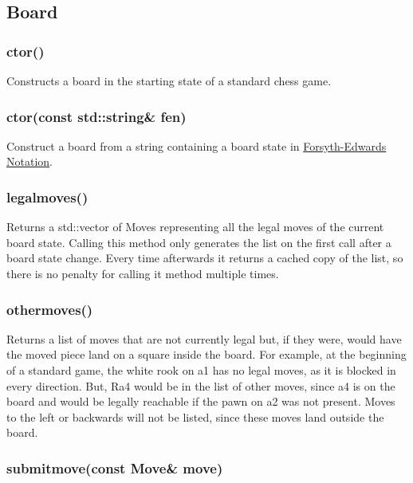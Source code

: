 \documentclass[letterpaper]{article}
\newcommand{\code}[1]{\textsf{#1}}
\renewcommand{\_}{\allowbreak\textunderscore\allowbreak}
\begin{document}
\subsection{Board}

\subsubsection{ctor()}

Constructs a board in the starting state of a standard chess game.

\subsubsection[ctor(string)]{ctor(const std::string\& fen)}

Construct a board from a string containing a board state in \href{https://en.wikipedia.org/wiki/Forsyth\%E2\%80\%93Edwards\_Notation}{Forsyth-Edwards Notation}.

\subsubsection{legal\_moves()}

Returns a \code{std::vector} of \code{Move}s representing all the legal moves of the current board state. Calling this method only generates the list on the first call after a board state change. Every time afterwards it returns a cached copy of the list, so there is no penalty for calling it method multiple times.

\subsubsection{other\_moves()}

Returns a list of moves that are not currently legal but, if they were, would have the moved piece land on a square inside the board. For example, at the beginning of a standard game, the white rook on a1 has no legal moves, as it is blocked in every direction. But, Ra4 would be in the list of other moves, since a4 is on the board and would be legally reachable if the pawn on a2 was not present. Moves to the left or backwards will not be listed, since these moves land outside the board.

\subsubsection[submit\_move()]{submit\_move(const Move\& move)}
\label{board-submit-move-section}
\end{document}
